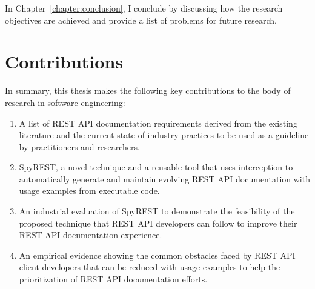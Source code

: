 In Chapter~\ref{chapter:conclusion}, I conclude by discussing how the research objectives are achieved and provide a list of problems for future research.

\section{Contributions}
In summary, this thesis makes the following key contributions to the body of research in software engineering:


\begin{enumerate}
  \item A list of REST API documentation requirements derived from the existing literature and the current state of industry practices to be used as a guideline by practitioners and researchers.
  \item SpyREST, a novel technique and a reusable tool that uses interception to automatically generate and maintain evolving REST API documentation with usage examples from executable code.
  \item An industrial evaluation of SpyREST to demonstrate the feasibility of the proposed technique that REST API developers can follow to improve their REST API documentation experience.
  \item An empirical evidence showing the common obstacles faced by REST API client developers that can be reduced with usage examples to help the prioritization of REST API documentation efforts.
\end{enumerate}





